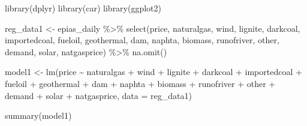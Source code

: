 \documentclass[
  11pt,
  a4paper,
]{article}
\newenvironment{Shaded}{\begin{snugshade}}{\end{snugshade}}
\newcommand{\AttributeTok}[1]{\textcolor[rgb]{0.40,0.45,0.13}{#1}}
\newcommand{\FunctionTok}[1]{\textcolor[rgb]{0.28,0.35,0.67}{#1}}
\newcommand{\NormalTok}[1]{\textcolor[rgb]{0.00,0.23,0.31}{#1}}
\newcommand{\OtherTok}[1]{\textcolor[rgb]{0.00,0.23,0.31}{#1}}
\newcommand{\SpecialCharTok}[1]{\textcolor[rgb]{0.37,0.37,0.37}{#1}}
\begin{document}
\begin{Shaded}
\begin{Highlighting}[]
\FunctionTok{library}\NormalTok{(dplyr)}
\FunctionTok{library}\NormalTok{(car)}
\FunctionTok{library}\NormalTok{(ggplot2)}

\NormalTok{reg\_data1 }\OtherTok{\textless{}{-}}\NormalTok{ epias\_daily }\SpecialCharTok{\%\textgreater{}\%}
  \FunctionTok{select}\NormalTok{(price, naturalgas, wind, lignite, darkcoal, importedcoal, fueloil, geothermal, dam, naphta, biomass, runofriver, other, demand, solar, natgasprice) }\SpecialCharTok{\%\textgreater{}\%}
  \FunctionTok{na.omit}\NormalTok{()}

\NormalTok{model1 }\OtherTok{\textless{}{-}} \FunctionTok{lm}\NormalTok{(price }\SpecialCharTok{\textasciitilde{}}\NormalTok{ naturalgas }\SpecialCharTok{+}\NormalTok{ wind }\SpecialCharTok{+}\NormalTok{ lignite }\SpecialCharTok{+}\NormalTok{ darkcoal }\SpecialCharTok{+}\NormalTok{ importedcoal }\SpecialCharTok{+}\NormalTok{ fueloil }\SpecialCharTok{+}\NormalTok{ geothermal }\SpecialCharTok{+}\NormalTok{ dam }\SpecialCharTok{+}\NormalTok{ naphta }\SpecialCharTok{+}\NormalTok{ biomass }\SpecialCharTok{+}\NormalTok{ runofriver }\SpecialCharTok{+}\NormalTok{ other }\SpecialCharTok{+}\NormalTok{ demand }\SpecialCharTok{+}\NormalTok{ solar }\SpecialCharTok{+}\NormalTok{ natgasprice, }\AttributeTok{data =}\NormalTok{ reg\_data1)}

\FunctionTok{summary}\NormalTok{(model1)}
\end{Highlighting}
\end{Shaded}
\end{document}
